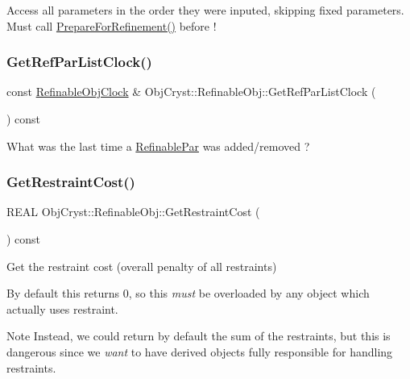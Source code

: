Access all parameters in the order they were inputed, skipping fixed parameters. Must call \mbox{\hyperlink{class_obj_cryst_1_1_refinable_obj_a6710a75c0477b6ad7e42400cdc6f1c32}{Prepare\+For\+Refinement()}} before ! \mbox{\label{class_obj_cryst_1_1_refinable_obj_a7cd089596963f9b08712075eac7edef4}} 
\subsubsection{\texorpdfstring{GetRefParListClock()}{GetRefParListClock()}}
{\footnotesize\ttfamily const \mbox{\hyperlink{class_obj_cryst_1_1_refinable_obj_clock}{Refinable\+Obj\+Clock}} \& Obj\+Cryst\+::\+Refinable\+Obj\+::\+Get\+Ref\+Par\+List\+Clock (\begin{DoxyParamCaption}{ }\end{DoxyParamCaption}) const}

What was the last time a \mbox{\hyperlink{class_obj_cryst_1_1_refinable_par}{Refinable\+Par}} was added/removed ? \mbox{\label{class_obj_cryst_1_1_refinable_obj_acae0de2f341ce808d1d656dad2f3fa57}} 
\subsubsection{\texorpdfstring{GetRestraintCost()}{GetRestraintCost()}}
{\footnotesize\ttfamily R\+E\+AL Obj\+Cryst\+::\+Refinable\+Obj\+::\+Get\+Restraint\+Cost (\begin{DoxyParamCaption}{ }\end{DoxyParamCaption}) const\hspace{0.3cm}{\ttfamily [virtual]}}

Get the restraint cost (overall penalty of all restraints)

By default this returns 0, so this {\itshape must} be overloaded by any object which actually uses restraint. \begin{DoxyNote}{Note}
Instead, we could return by default the sum of the restraints, but this is dangerous since we {\itshape want} to have derived objects fully responsible for handling restraints. 
\end{DoxyNote}
\mbox{\label{class_obj_cryst_1_1_refinable_obj_afcbc5dbf18eca074efa669ba9f51502f}} 
